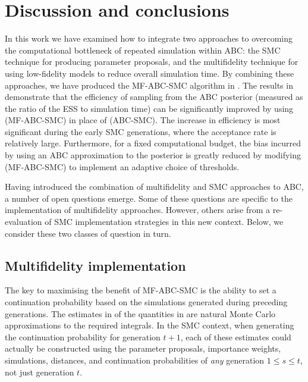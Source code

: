 \documentclass[review,demo]{siamonline190516}
\begin{document}
\section{Discussion and conclusions}
\label{s:Discussion}

In this work we have examined how to integrate two approaches to overcoming the computational bottleneck of repeated simulation within ABC: 
the SMC technique for producing parameter proposals,
and the multifidelity technique for using low-fidelity models to reduce overall simulation time.
By combining these approaches, we have produced the MF-ABC-SMC algorithm in .
The results in  demonstrate that the efficiency of sampling from the ABC posterior (measured as the ratio of the ESS to simulation time) can be significantly improved by using  (MF-ABC-SMC) in place of  (ABC-SMC).
The increase in efficiency is most significant during the early SMC generations, where the acceptance rate is relatively large.
Furthermore, for a fixed computational budget, the bias incurred by using an ABC approximation to the posterior is greatly reduced by modifying  (MF-ABC-SMC) to implement an adaptive choice of thresholds.

Having introduced the combination of multifidelity and SMC approaches to ABC, a number of open questions emerge.
Some of these questions are specific to the implementation of multifidelity approaches.
However, others arise from a re-evaluation of SMC implementation strategies in this new context.
Below, we consider these two classes of question in turn.

\subsection{Multifidelity implementation}

The key to maximising the benefit of MF-ABC-SMC is the ability to set a continuation probability based on the simulations generated during preceding generations.
The estimates in  of the quantities in  are natural Monte Carlo approximations to the required integrals.
In the SMC context, when generating the continuation probability for generation $t+1$, each of these estimates could actually be constructed using the parameter proposals, importance weights, simulations, distances, and continuation probabilities of \emph{any} generation $1 \leq s \leq t$, not just generation $t$.
\end{document}
